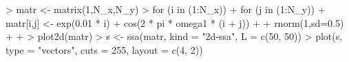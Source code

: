 \begin{CodeChunk}
\begin{CodeInput}


> matr <- matrix(1,N_x,N_y)
> for (i in (1:N_x)){
+   for (j in (1:N_y)){
+     matr[i,j] <- exp(0.01 * i) + cos(2 * pi * omega1 * (i + j))  + 
+       rnorm(1,sd=0.5)
+   }
+ }
> plot2d(matr)
> s <- ssa(matr, kind = "2d-ssa", L = c(50, 50))
> plot(s, type = "vectors", cuts = 255, layout = c(4, 2))
\end{CodeInput}

\end{CodeChunk}